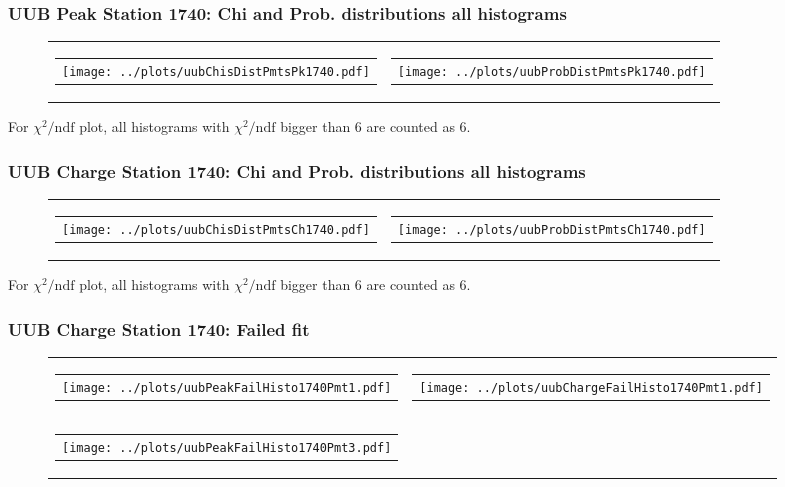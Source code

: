 \documentclass[aspectratio=169]{beamer}
\begin{document}

\begin{frame}
  \frametitle{UUB Peak Station 1740: Chi and Prob. distributions all histograms}
  \begin{figure}
    \centering
    \begin{tabularx}{\textwidth}{CC}
      \begin{tabular}{l}
        \texttt{[image: ../plots/uubChisDistPmtsPk1740.pdf]}
      \end{tabular}
      &
      \begin{tabular}{l}
        \texttt{[image: ../plots/uubProbDistPmtsPk1740.pdf]}
      \end{tabular}
    \end{tabularx}
  \end{figure}
  For $\chi^2 / \mathrm{ndf}$ plot, all histograms with $\chi^2 / \mathrm{ndf}$ 
  bigger than 6 are counted as 6.
\end{frame}


\begin{frame}
  \frametitle{UUB Charge Station 1740: Chi and Prob. distributions all histograms}
  \begin{figure}
    \centering
    \begin{tabularx}{\textwidth}{CC}
      \begin{tabular}{l}
        \texttt{[image: ../plots/uubChisDistPmtsCh1740.pdf]}
      \end{tabular}
      &
      \begin{tabular}{l}
        \texttt{[image: ../plots/uubProbDistPmtsCh1740.pdf]}
      \end{tabular}
    \end{tabularx}
  \end{figure}
  For $\chi^2 / \mathrm{ndf}$ plot, all histograms with $\chi^2 / \mathrm{ndf}$ 
  bigger than 6 are counted as 6.
\end{frame}


\begin{frame}
  \frametitle{UUB Charge Station 1740: Failed fit}
  \begin{figure}
    \centering
    \begin{tabularx}{\textwidth}{CC}
      \begin{tabular}{l}
        \texttt{[image: ../plots/uubPeakFailHisto1740Pmt1.pdf]}
      \end{tabular}
      &
      \begin{tabular}{l}
        \texttt{[image: ../plots/uubChargeFailHisto1740Pmt1.pdf]}
      \end{tabular}
      \\
      \begin{tabular}{l}
        \texttt{[image: ../plots/uubPeakFailHisto1740Pmt3.pdf]}
      \end{tabular}
    \end{tabularx}
  \end{figure}
\end{frame}
\end{document}
